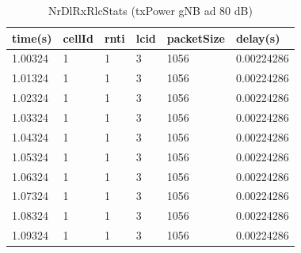 \documentclass[12pt,a4paper]{article}
\begin{document}
\begin{table}[!ht]
    \centering
    \begin{tabular}{|l|l|l|l|l|l|}
    \hline
        time(s) & cellId & rnti & lcid & packetSize & delay(s) \\ \hline
        1.00324 & 1 & 1 & 3 & 1056 & 0.00224286 \\ \hline
        1.01324 & 1 & 1 & 3 & 1056 & 0.00224286 \\ \hline
        1.02324 & 1 & 1 & 3 & 1056 & 0.00224286 \\ \hline
        1.03324 & 1 & 1 & 3 & 1056 & 0.00224286 \\ \hline
        1.04324 & 1 & 1 & 3 & 1056 & 0.00224286 \\ \hline
        1.05324 & 1 & 1 & 3 & 1056 & 0.00224286 \\ \hline
        1.06324 & 1 & 1 & 3 & 1056 & 0.00224286 \\ \hline
        1.07324 & 1 & 1 & 3 & 1056 & 0.00224286 \\ \hline
        1.08324 & 1 & 1 & 3 & 1056 & 0.00224286 \\ \hline
        1.09324 & 1 & 1 & 3 & 1056 & 0.00224286 \\ \hline
    \end{tabular}
    \caption{NrDlRxRlcStats (txPower gNB ad 80 dB)}
\end{table}
\end{document}
